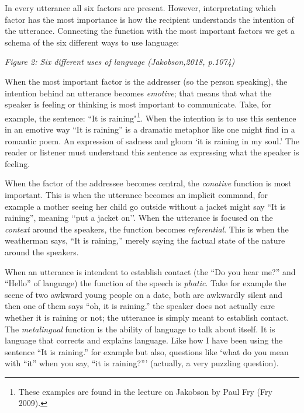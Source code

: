 \noindent In every utterance all six factors are present. However, interpretating which factor has the most importance is how the recipient understands the intention of the utterance. Connecting the function with the most important factors we get a schema of the six different ways to use language: 

\vspace{0.3cm}

\small
{}

{\it \footnotesize Figure 2: Six different uses of language (Jakobson,2018, p.1074)}

\vspace{0.3cm}


When the most important factor is the addresser (so the person speaking), the intention behind an utterance becomes \textit{emotive}; that means that what the speaker is feeling or thinking is most important to communicate. Take, for example, the sentence: “It is raining"\footnote{These examples are found  in the lecture on Jakobson by Paul Fry (Fry 2009).}. When the intention is to use this sentence in an emotive way “It is raining” is a dramatic metaphor like one might find in a romantic poem. An expression of sadness and gloom ‘it is raining in my soul.’ The reader or listener must understand this sentence as expressing what the speaker is feeling. 						

When the factor of the addressee becomes central, the \textit{conative} function is most important. This is when the utterance becomes an implicit command, for example a mother seeing her child go outside without a jacket might say “It is raining”, meaning \lq\lq put a jacket on\rq\rq. 				
When the utterance is focused on the \textit{context} around  the speakers, the function becomes {\it referential}. This is when the weatherman says, “It is raining,” merely saying the factual state of the nature around  the speakers. 				

When an utterance is intendent to establish contact (the “Do you hear me?” and “Hello” of language) the function of the speech is \textit{phatic}. Take for example the scene of two awkward young people on a date, both are awkwardly silent and then one of them says “oh, it is raining.” the speaker does not actually care whether it is raining or not; the utterance is simply meant to establish contact. 						
The \textit{metalingual} function is the ability of language to talk about itself. It is language that corrects and explains language. Like how I have been using the sentence “It is raining.” for example but also, questions like ‘what do you mean with “it” when you say, “it is raining?”’ (actually, a very puzzling question). 							

